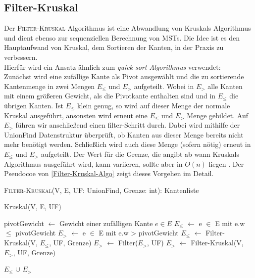 \newpage


\subsection{Filter-Kruskal}
Der \textsc{Filter-Kruskal} Algorithmus \cite{osipov2009filter} ist eine Abwandlung von Kruskals Algorithmus und dient ebenso zur sequenziellen Berechnung von MSTs. Die Idee ist es den Hauptaufwand von Kruskal, dem Sortieren der Kanten, in der Praxis zu verbessern.\\
Hierfür wird ein Ansatz ähnlich zum \emph{quick sort Algorithmus} \cite{hoare1962quicksort} verwendet: \\
Zunächst wird eine zufällige Kante als Pivot ausgewählt und die zu sortierende Kantenmenge in zwei Mengen $E_{\leq}$ und $E_>$ aufgeteilt. Wobei in $E_>$ alle Kanten mit einem größeren Gewicht, als die Pivotkante enthalten sind und in $E_{\leq}$ die übrigen Kanten.
Ist $E_{\leq}$ klein genug, so wird auf dieser Menge der normale Kruskal ausgeführt, ansonsten wird erneut eine $E_{\leq}$ und $E_>$ Menge gebildet. Auf $E_>$ führen wir anschließend einen filter-Schritt durch. Dabei wird mithilfe der UnionFind Datenstruktur überprüft, ob Kanten aus dieser Menge bereits nicht mehr benötigt werden. Schließlich wird auch diese Menge (sofern nötig) erneut in $E_{\leq}$ und $E_>$ aufgeteilt. Der Wert für die Grenze, die angibt ab wann Kruskals Algorithmus ausgeführt wird, kann variieren, sollte aber in $O(n)$ liegen \cite{osipov2009filter}.
Der Pseudocoe von \cref{Filter-Kruskal-Algo} zeigt dieses Vorgehen im Detail.\\



\begin{algorithm} 
\caption{\textsc{Filter-Kruskal}(V, E, UF: UnionFind, Grenze: int): Kantenliste}
\begin{algorithmic}[1]
\label{Filter-Kruskal-Algo}

    \RETURN Kruskal(V, E, UF)
\ENDIF

\STATE pivotGewicht $\gets$ Gewicht einer zufälligen Kante $e \in E$
\STATE $E_{\leq}$ $\gets$ e $\in$ E mit e.w $\leq$ pivotGewicht
\STATE $E_>$ $\gets$ e $\in$ E mit e.w > pivotGewicht
\STATE $E_{\leq}$ $\gets$ Filter-Kruskal(V, $E_{\leq}$, UF, Grenze)
\STATE $E_>$ $\gets$ Filter($E_>$, UF)
\STATE $E_>$ $\gets$ Filter-Kruskal(V, $E_>$, UF, Grenze)

\RETURN  $E_{\leq}$ $\cup$ $E_>$


\end{algorithmic}
\end{algorithm}


